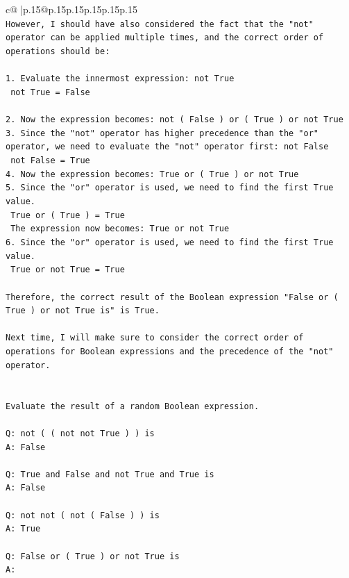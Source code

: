 \documentclass{article}
\begin{document}
{\begin{supertabular}{c@{$\;$}|p{.15\linewidth}@{}p{.15\linewidth}p{.15\linewidth}p{.15\linewidth}p{.15\linewidth}p{.15\linewidth}}
{{{\\ 
\texttt{However, I should have also considered the fact that the "not" operator can be applied multiple times, and the correct order of operations should be:} \\
\\ 
\texttt{1. Evaluate the innermost expression: not True} \\
\texttt{   not True = False} \\
\\ 
\texttt{2. Now the expression becomes: not ( False ) or ( True ) or not True} \\
\texttt{3. Since the "not" operator has higher precedence than the "or" operator, we need to evaluate the "not" operator first: not False} \\
\texttt{   not False = True} \\
\texttt{4. Now the expression becomes: True or ( True ) or not True} \\
\texttt{5. Since the "or" operator is used, we need to find the first True value. } \\
\texttt{   True or ( True ) = True} \\
\texttt{   The expression now becomes: True or not True} \\
\texttt{6. Since the "or" operator is used, we need to find the first True value. } \\
\texttt{   True or not True = True} \\
\\ 
\texttt{Therefore, the correct result of the Boolean expression "False or ( True ) or not True is" is True. } \\
\\ 
\texttt{Next time, I will make sure to consider the correct order of operations for Boolean expressions and the precedence of the "not" operator.} \\
\\ 
\\ 
\texttt{Evaluate the result of a random Boolean expression.} \\
\\ 
\texttt{Q: not ( ( not not True ) ) is} \\
\texttt{A: False} \\
\\ 
\texttt{Q: True and False and not True and True is} \\
\texttt{A: False} \\
\\ 
\texttt{Q: not not ( not ( False ) ) is} \\
\texttt{A: True} \\
\\ 
\texttt{Q: False or ( True ) or not True is} \\
\texttt{A:} \\
            }
        }
    }
     \\ \\


\end{supertabular}}
\end{document}
